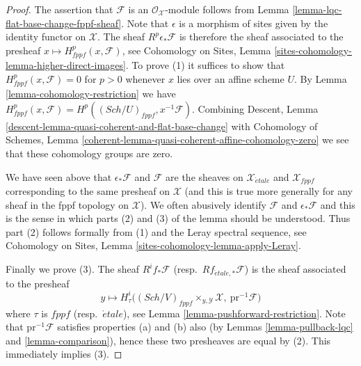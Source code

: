 \documentclass[10pt,a4paper]{amsart}
\theoremstyle{plain}
\theoremstyle{definition}
\theoremstyle{remark}
\numberwithin{equation}{subsection}
\def\Sch{\mathit{Sch}}
\def\etale{{\acute{e}tale}}
\begin{document}
\begin{proof}
The assertion that $\mathcal{F}$ is an $\mathcal{O}_\mathcal{X}$-module
follows from
Lemma \ref{lemma-lqc-flat-base-change-fppf-sheaf}.
Note that $\epsilon$ is a morphism of sites given by the identity
functor on $\mathcal{X}$. The sheaf $R^p\epsilon_*\mathcal{F}$ is therefore
the sheaf associated to the presheaf
$x \mapsto H^p_{fppf}(x, \mathcal{F})$, see
Cohomology on Sites, Lemma \ref{sites-cohomology-lemma-higher-direct-images}.
To prove (1) it suffices to show that
$H^p_{fppf}(x, \mathcal{F}) = 0$ for $p > 0$
whenever $x$ lies over an affine scheme $U$. By
Lemma \ref{lemma-cohomology-restriction}
we have
$H^p_{fppf}(x, \mathcal{F}) = H^p((\Sch/U)_{fppf}, x^{-1}\mathcal{F})$.
Combining
Descent, Lemma \ref{descent-lemma-quasi-coherent-and-flat-base-change}
with Cohomology of Schemes, Lemma
\ref{coherent-lemma-quasi-coherent-affine-cohomology-zero}
we see that these cohomology groups are zero.

\medskip\noindent
We have seen above that $\epsilon_*\mathcal{F}$ and $\mathcal{F}$ are the
sheaves on $\mathcal{X}_\etale$ and $\mathcal{X}_{fppf}$
corresponding to the same presheaf on $\mathcal{X}$ (and this is true more
generally for any sheaf in the fppf topology on $\mathcal{X}$).
We often abusively identify $\mathcal{F}$ and $\epsilon_*\mathcal{F}$
and this is the sense in which parts (2) and (3) of the lemma should be
understood. Thus part (2) follows formally from (1) and the Leray spectral
sequence, see
Cohomology on Sites, Lemma \ref{sites-cohomology-lemma-apply-Leray}.

\medskip\noindent
Finally we prove (3). The sheaf $R^if_*\mathcal{F}$
(resp.\ $Rf_{\etale, *}\mathcal{F}$)
is the sheaf associated to the presheaf
$$
y \longmapsto
H^i_\tau\Big((\Sch/V)_{fppf} \times_{y, \mathcal{Y}} \mathcal{X},
\ \text{pr}^{-1}\mathcal{F}\Big)
$$
where $\tau$ is $fppf$ (resp.\ $\etale$), see
Lemma \ref{lemma-pushforward-restriction}.
Note that $\text{pr}^{-1}\mathcal{F}$ satisfies properties (a) and (b)
also (by Lemmas \ref{lemma-pullback-lqc} and \ref{lemma-comparison}),
hence these two presheaves are equal by (2).
This immediately implies (3).
\end{proof}
\end{document}
